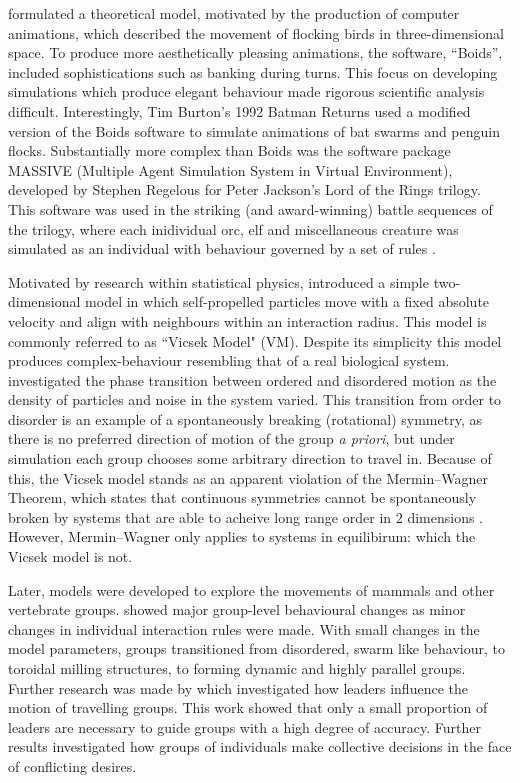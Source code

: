\citet{reynolds87} formulated a theoretical model, motivated by the production of computer animations, which described the movement of flocking birds in three-dimensional space. To produce more aesthetically pleasing animations, the software, ``Boids'', included sophistications such as banking during turns. This focus on developing simulations which produce elegant behaviour made rigorous scientific analysis difficult. Interestingly, Tim Burton's 1992 Batman Returns used a modified version of the Boids software to simulate animations of bat swarms and penguin flocks. Substantially more complex than Boids was the software package MASSIVE (Multiple Agent Simulation System in Virtual Environment), developed by Stephen Regelous for Peter Jackson's Lord of the Rings trilogy. This software was used in the striking (and award-winning) battle sequences of the trilogy, where each inidividual orc, elf and miscellaneous creature was simulated as an individual with behaviour governed by a set of rules \citep{robbins17}.

Motivated by research within statistical physics, \citet{vicsek95} introduced a simple two-dimensional model in which self-propelled particles move with a fixed absolute velocity and align with neighbours within an interaction radius. This model is commonly referred to as ``Vicsek Model" (VM). Despite its simplicity this model produces complex-behaviour resembling that of a real biological system. \citet{vicsek95} investigated the phase transition between ordered and disordered motion as the density of particles and noise in the system varied. This transition from order to disorder is an example of a spontaneously breaking (rotational) symmetry, as there is no preferred direction of motion of the group \emph{a priori}, but under simulation each group chooses some arbitrary direction to travel in. Because of this, the Vicsek model stands as an apparent violation of the Mermin--Wagner Theorem, which states that continuous symmetries cannot be spontaneously broken by systems that are able to acheive long range order in $2$ dimensions \citep{mermin66}. However, Mermin--Wagner only applies to systems in equilibirum: which the Vicsek model is not.

Later, models were developed to explore the movements of mammals and other vertebrate groups. \citet{couzin02} showed major group-level behavioural changes as minor changes in individual interaction rules were made. With small changes in the model parameters, groups transitioned from disordered, swarm like behaviour, to toroidal milling structures, to forming dynamic and highly parallel groups. Further research was made by \citet{couzin05} which investigated how leaders influence the motion of travelling groups. This work showed that only a small proportion of leaders are necessary to guide groups with a high degree of accuracy. Further results investigated how groups of individuals make collective decisions in the face of conflicting desires.

